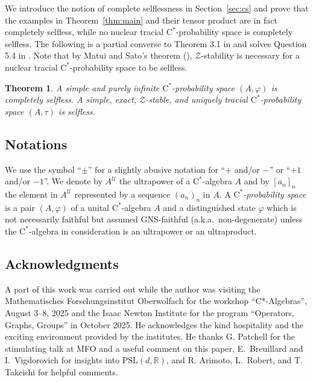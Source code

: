 \documentclass[12pt,nosumlimits,nonamelimits]{amsart}
\newtheorem{thm}{Theorem}
\theoremstyle{remark}
\theoremstyle{definition}
\newcommand{\IR}{\mathbb{R}}
\newcommand{\cU}{\mathcal{U}}
\newcommand{\cZ}{\mathcal{Z}}
\newcommand{\vp}{\varphi}
\begin{document}
We introduce the notion of complete selflessness in Section~\ref{sec:cs} and 
prove that the examples in Theorem~\ref{thm:main} and their tensor product 
are in fact completely selfless, while 
no nuclear tracial $\mathrm{C}^*$-prob\-a\-bility space is completely selfless. 
The following is a partial converse to 
Theorem 3.1 in \cite{robert} and solves Question 5.4 in \cite{robert}. 
Note that by Matui and Sato's theorem (\cite{ms}), 
$\cZ$-stability is necessary for a nuclear 
tracial $\mathrm{C}^*$-prob\-a\-bility space to be selfless.

\begin{thm}\label{thm:general}
A simple and purely infinite 
$\mathrm{C}^*$-prob\-a\-bility space $(A,\vp)$ 
is completely selfless. 
A simple, exact, $\cZ$-stable, and uniquely tracial 
$\mathrm{C}^*$-prob\-a\-bility space $(A,\tau)$ 
is selfless. 
\end{thm}

%
%
\subsection*{Notations}
We use the symbol ``$\pm$'' for a slightly abusive notation 
for ``$+$ and/or $-$'' or ``$+1$ and/or $-1$''. 
We denote by $A^\cU$ the ultrapower of 
a $\mathrm{C}^*$-alge\-bra $A$ and 
by $[a_n]_n$ the element in $A^\cU$ 
represented by a sequence $(a_n)_n$ in $A$. 
A \emph{$\mathrm{C}^*$-prob\-a\-bility space}   
is a pair $(A,\vp)$ of a unital $\mathrm{C}^*$-alge\-bra $A$ 
and a distinguished state $\vp$ which is not necessarily faithful 
but assumed GNS-faithful (a.k.a.\ non-degenerate) 
unless the $\mathrm{C}^*$-alge\-bra 
in consideration is an ultrapower or an ultraproduct. 

\subsection*{Acknowledgments}
A part of this work was carried out while the author was visiting 
the Mathematisches Forschungsinstitut Oberwolfach for 
the workshop ``C*-Algebras'', August 3--8, 2025 and 
the Isaac Newton Institute for the program 
``Operators, Graphs, Groups'' in October 2025. 
He acknowledges the kind hospitality and the exciting
environment provided by the institutes. 
He thanks G. Patchell for the stimulating talk at MFO 
and a useful comment on this paper, 
E.~Breuillard and I.~Vigdorovich
for insights into $\mathrm{PSL}(d,\IR)$, 
and R. Arimoto, L.~Robert, and T. Takeishi for helpful comments. 
%
\end{document}

